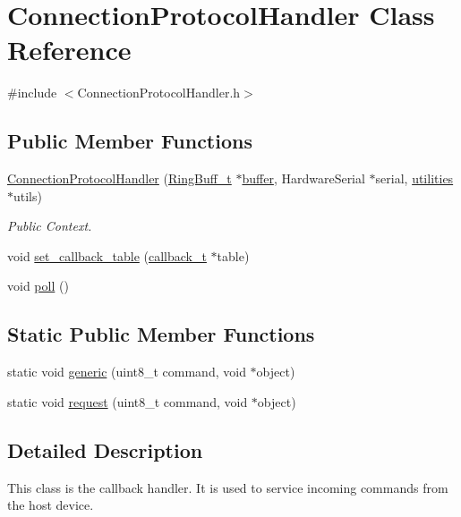 \hypertarget{class_connection_protocol_handler}{\section{\-Connection\-Protocol\-Handler \-Class \-Reference}
\label{class_connection_protocol_handler}
}


{\ttfamily \#include $<$\-Connection\-Protocol\-Handler.\-h$>$}

\subsection*{\-Public \-Member \-Functions}
\begin{DoxyCompactItemize}
\item 
\hyperlink{class_connection_protocol_handler_aba243f08aafb26db4c9e5e71732ea293}{\-Connection\-Protocol\-Handler} (\hyperlink{struct_ring_buff__t}{\-Ring\-Buff\-\_\-t} $\ast$\hyperlink{_main_8cpp_af570f243f3075e66aa6b4938759826f0}{buffer}, \-Hardware\-Serial $\ast$serial, \hyperlink{classutilities}{utilities} $\ast$utils)
\begin{DoxyCompactList}\small\item\em \-Public \-Context. \end{DoxyCompactList}\item 
void \hyperlink{class_connection_protocol_handler_af8b3a3a0e921bf3d45eaca8301e25fe5}{set\-\_\-callback\-\_\-table} (\hyperlink{structcallback__t}{callback\-\_\-t} $\ast$table)
\item 
void \hyperlink{class_connection_protocol_handler_a7ff2a420924a2bc81152f22972ec2822}{poll} ()
\end{DoxyCompactItemize}
\subsection*{\-Static \-Public \-Member \-Functions}
\begin{DoxyCompactItemize}
\item 
static void \hyperlink{class_connection_protocol_handler_a956d4439d9ebc3932949c6ff95f9b4d9}{generic} (uint8\-\_\-t command, void $\ast$object)
\item 
static void \hyperlink{class_connection_protocol_handler_a0caba597a54e32503cff6e45c1b26720}{request} (uint8\-\_\-t command, void $\ast$object)
\end{DoxyCompactItemize}


\subsection{\-Detailed \-Description}
\-This class is the callback handler. \-It is used to service incoming commands from the host device.

